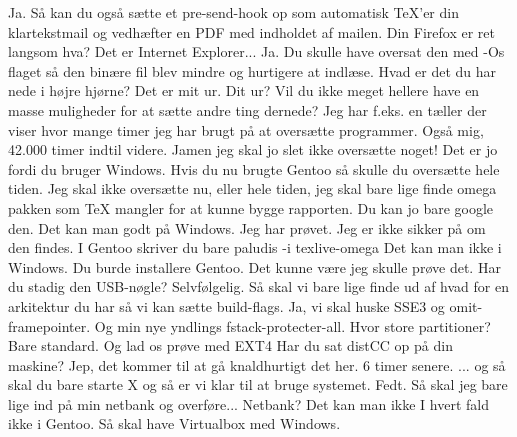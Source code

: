 \documentclass[a4paper,11pt]{article}
\begin{document}
\begin{sketch}
 Ja. Så kan du også sætte et pre-send-hook op som automatisk \TeX{}'er din klartekstmail og vedhæfter en PDF med indholdet af mailen.
 Din Firefox er ret langsom hva?
 Det er Internet Explorer...
 Ja. Du skulle have oversat den med -Os flaget så den binære fil blev mindre og hurtigere at indlæse.
 Hvad er det du har nede i højre hjørne?
 Det er mit ur.
 Dit ur? Vil du ikke meget hellere have en masse muligheder for at sætte andre ting dernede?
 Jeg har f.eks. en tæller der viser hvor mange timer jeg har brugt på at oversætte programmer.
 Også mig, 42.000 timer indtil videre.
 Jamen jeg skal jo slet ikke oversætte noget!
 Det er jo fordi du bruger Windows.
 Hvis du nu brugte Gentoo så skulle du oversætte hele tiden.
 Jeg skal ikke oversætte nu, eller hele tiden, jeg skal bare lige finde omega pakken som \TeX{} mangler for at kunne bygge rapporten.
 Du kan jo bare google den.
 Det kan man godt på Windows.
 Jeg har prøvet. Jeg er ikke sikker på om den findes.
 I Gentoo skriver du bare paludis -i texlive-omega
 Det kan man ikke i Windows.
 Du burde installere Gentoo.
 Det kunne være jeg skulle prøve det. Har du stadig den USB-nøgle?
 Selvfølgelig.
 Så skal vi bare lige finde ud af hvad for en arkitektur du har så vi kan sætte build-flags.
 Ja, vi skal huske SSE3 og omit-framepointer.
 Og min nye yndlings fstack-protecter-all.
 Hvor store partitioner?
 Bare standard. Og lad os prøve med EXT4
 Har du sat distCC op på din maskine?
 Jep, det kommer til at gå knaldhurtigt det her.
 6 timer senere.
 ... og så skal du bare starte X og så er vi klar til at bruge systemet.
 Fedt. Så skal jeg bare lige ind på min netbank og overføre...
 Netbank?
 Det kan man ikke
 I hvert fald ikke i Gentoo.
 Så skal have Virtualbox med Windows.

\end{sketch}
\end{document}
